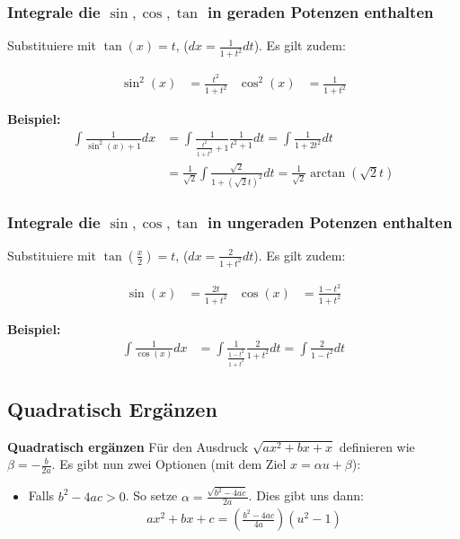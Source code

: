 \documentclass[25pt]{sciposter}
\newenvironment{method}[1]{\begin{mdframed}[backgroundcolor=blue!10,innertopmargin=15pt, innerbottommargin=15pt, nobreak=true]
		\textbf{#1 }
	}
	{ 
	\end{mdframed}
}
\begin{document}
\begin{multicols}{3}
\subsubsection*{Integrale die $\sin, \cos, \tan$ in geraden Potenzen enthalten}
Substituiere mit $\tan(x) = t$, ($dx = \frac{1}{1+t^2} dt$). Es gilt zudem:

\begin{align*}
\sin^2(x) &= \frac{t^2}{1+t^2} & \cos^2(x) &= \frac{1}{1+t^2}
\end{align*}

\textbf{Beispiel:}
\begin{align*}
	\int \frac{1}{\sin^2(x) + 1} dx &= \int \frac{1}{\frac{t^2}{1+t^2} + 1} \frac{1}{t^2 + 1} dt = \int \frac{1}{1+2t^2} dt\\ &= \frac{1}{\sqrt{2}} \int  \frac{\sqrt{2}}{1 + (\sqrt{2}t)^2} dt = \frac{1}{\sqrt{2}} \arctan(\sqrt{2}t)
\end{align*}


\subsubsection*{Integrale die $\sin, \cos, \tan$ in ungeraden Potenzen enthalten}
Substituiere mit $\tan(\frac{x}{2}) = t$, ($dx = \frac{2}{1+t^2} dt$). Es gilt zudem:

\begin{align*}
\sin(x) &= \frac{2t}{1+t^2} & \cos(x) &= \frac{1-t^2}{1+t^2}
\end{align*}

\textbf{Beispiel:}
\begin{align*}
	\int \frac{1}{\cos(x)} dx &= \int \frac{1}{\frac{1-t^2}{1+t^2}} \frac{2}{1+t^2} dt = \int \frac{2}{1-t^2} dt
\end{align*}

\subsection*{Quadratisch Ergänzen}
\begin{method}{Quadratisch ergänzen} Für den Ausdruck $\sqrt{ax^2 + bx + x}$ definieren wie $\beta = - \frac{b}{2a}$. Es gibt nun zwei Optionen (mit dem Ziel $x= \alpha u + \beta$):

\begin{itemize}
	\item Falls $b^2 - 4ac > 0$. So setze $\alpha = \frac{\sqrt{b^2 - 4ac}}{2a}$. Dies gibt uns dann:
	\begin{align*}
		ax^2 + bx + c = \left(\frac{b^2 -4ac}{4a}\right)\left(u^2 - 1\right)
	\end{align*}
	

\end{itemize}
\end{method}
\end{multicols}
\end{document}
